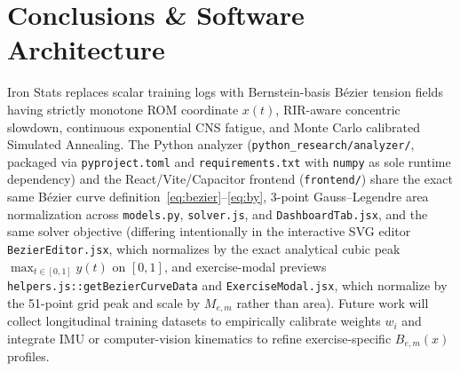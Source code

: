 \documentclass[10pt,twocolumn,letterpaper]{article}
\theoremstyle{plain}
\theoremstyle{definition}
\begin{document}
\section{Conclusions \texorpdfstring{\&}{and} Software Architecture}
\label{sec:conclusions}

Iron Stats replaces scalar training logs with Bernstein-basis B\'ezier tension fields having strictly monotone ROM coordinate $x(t)$, RIR-aware concentric slowdown, continuous exponential CNS fatigue, and Monte Carlo calibrated Simulated Annealing. The Python analyzer (\texttt{python\_research/analyzer/}, packaged via \texttt{pyproject.toml} and \texttt{requirements.txt} with \texttt{numpy} as sole runtime dependency) and the React/Vite/Capacitor frontend (\texttt{frontend/}) share the exact same B\'ezier curve definition~\eqref{eq:bezier}--\eqref{eq:by}, 3-point Gauss--Legendre area normalization across \texttt{models.py}, \texttt{solver.js}, and \texttt{DashboardTab.jsx}, and the same solver objective (differing intentionally in the interactive SVG editor \texttt{BezierEditor.jsx}, which normalizes by the exact analytical cubic peak $\max_{t\in[0,1]} y(t)$ on $[0, 1]$, and exercise-modal previews \texttt{helpers.js::getBezierCurveData} and \texttt{ExerciseModal.jsx}, which normalize by the 51-point grid peak and scale by $M_{e,m}$ rather than area). Future work will collect longitudinal training datasets to empirically calibrate weights $w_i$ and integrate IMU or computer-vision kinematics to refine exercise-specific $B_{e,m}(x)$ profiles.
\end{document}
